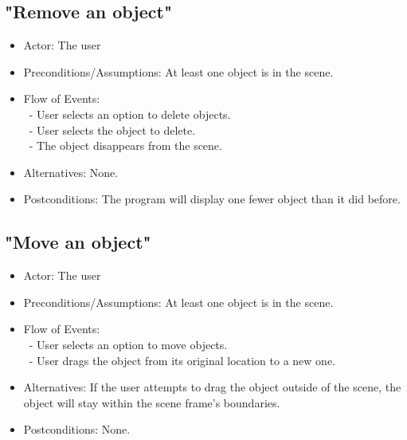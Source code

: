 \documentclass[12pt]{article}
\begin{document}

	\subsection{"Remove an object"}
\begin{itemize}
	\item Actor: The user
	\item Preconditions/Assumptions: At least one object is in the scene.
	\item Flow of Events: \\
	\	- User selects an option to delete objects. \\
	\	- User selects the object to delete. \\
	\	- The object disappears  from the scene.
	\item Alternatives: None.
	\item Postconditions: The program will display one fewer object than it did before.
\end{itemize}

	\subsection{"Move an object"}
\begin{itemize}
	\item Actor: The user
		\item Preconditions/Assumptions: At least one object is in the scene.
	\item Flow of Events: \\
	\	- User selects an option to move objects. \\
	\	- User drags the object from its original location to a new one.
	\item Alternatives: If the user attempts to drag the object outside of the scene, the object
	will stay within the scene frame's boundaries.
	\item Postconditions: None.
\end{itemize}

	
\end{document}
